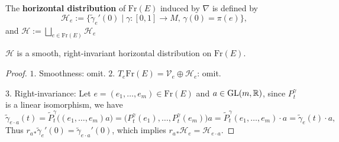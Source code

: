 \begin{definition}
    The \textbf{horizontal distribution} of $\mathrm{Fr}(E)$ induced by $\nabla$ is defined by 
    \begin{equation*}
        \mathcal{H}_e := \{\tilde{\gamma}_e'(0) \mid \gamma: [0,1]\to M,\,\gamma(0) = \pi(e)\},
    \end{equation*}
    and $\mathcal{H}:=\bigsqcup_{e\in \mathrm{Fr}(E)} \mathcal{H}_e$
\end{definition}
\begin{proposition}
    $\mathcal{H}$ is a smooth, right-invariant horizontal distribution on $\mathrm{Fr}(E)$.
\end{proposition}
\begin{proof}
    $1.$ Smoothness: omit.
    $2.$ $T_e\mathrm{Fr}(E) = \mathcal{V}_e\oplus \mathcal{H}_e$: omit.
    
    \noindent$3.$ Right-invariance: Let $e=(e_1, \ldots, e_m)\in \mathrm{Fr}(E)$ and $a\in\mathrm{GL}(m,\mathbb{R})$, 
    since $P^\gamma_t$ is a linear isomorphism, we have
    \begin{equation*}
        \tilde{\gamma}_{e\cdot a}(t) = \tilde{P}^\gamma_t\Big((e_1, \ldots, e_m)a\Big) 
        = \big(P^\gamma_t(e_1), \ldots, P^\gamma_t(e_m)\big)a = \tilde{P}^\gamma_t(e_1, \ldots, e_m)\cdot a
        = \tilde{\gamma}_e(t)\cdot a,
    \end{equation*}
    Thus $r_a{}_*\tilde{\gamma}_e'(0) = \tilde{\gamma}_{e\cdot a}'(0)$, which implies $r_a{}_*\mathcal{H}_e = \mathcal{H}_{e\cdot a}$. 
\end{proof}

